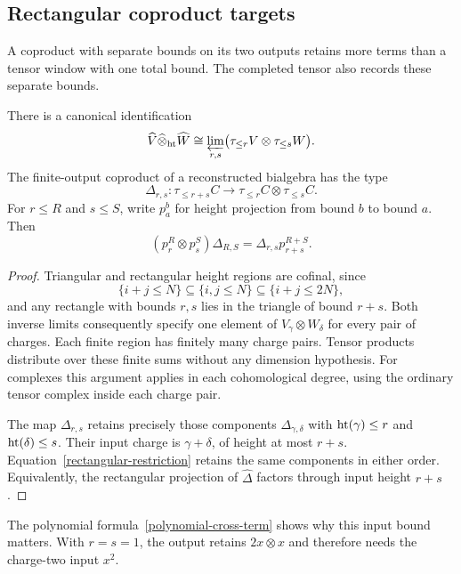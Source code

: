 \subsection{Rectangular coproduct targets}

A coproduct with separate bounds on its two outputs retains more terms
than a tensor window with one total bound.  The completed tensor also
records these separate bounds.

\begin{proposition}\label{rectangular-tensor}
There is a canonical identification
\[
 \widehat V\widehat\otimes_{\mathrm{ht}}\widehat W
 \cong\varprojlim_{r,s}
 \bigl(\tau_{\leq r}V\otimes\tau_{\leq s}W\bigr).
\]
The finite-output coproduct of a reconstructed bialgebra has the type
\begin{equation}
 \Delta_{r,s}:\tau_{\leq r+s}C
 \longrightarrow\tau_{\leq r}C\otimes\tau_{\leq s}C.
 \label{rectangular-coproduct}
\end{equation}
For $r\leq R$ and $s\leq S$, write $p_a^b$ for height projection
from bound $b$ to bound $a$.  Then
\begin{equation}
 (p_r^R\otimes p_s^S)\Delta_{R,S}
   =\Delta_{r,s}p_{r+s}^{R+S}.
 \label{rectangular-restriction}
\end{equation}
\end{proposition}

\begin{proof}
Triangular and rectangular height regions are cofinal, since
\[
 \{i+j\leq N\}\subseteq\{i,j\leq N\}
 \subseteq\{i+j\leq2N\},
\]
and any rectangle with bounds $r,s$ lies in the triangle of bound $r+s$.
Both inverse limits consequently specify one element of
$V_\gamma\otimes W_\delta$ for every pair of charges.
Each finite region has finitely many charge pairs.  Tensor products
distribute over these finite sums without any dimension hypothesis.
For complexes this argument applies in each cohomological degree,
using the ordinary tensor complex inside each charge pair.

The map $\Delta_{r,s}$ retains precisely those components
$\Delta_{\gamma,\delta}$ with
$\operatorname{ht}(\gamma)\leq r$ and $\operatorname{ht}(\delta)\leq s$.
Their input charge is $\gamma+\delta$, of height at most $r+s$.
Equation~\eqref{rectangular-restriction} retains the same components
in either order.  Equivalently, the rectangular projection of
$\widehat\Delta$ factors through input height $r+s$.
\end{proof}

The polynomial formula~\eqref{polynomial-cross-term} shows why this
input bound matters.  With $r=s=1$, the output retains $2x\otimes x$
and therefore needs the charge-two input $x^2$.

